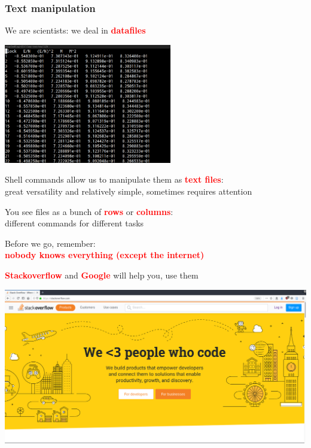 \documentclass[unknownkeysallowed, 10pt, a4 paper, handout]{beamer}
\newcommand{\focus}[1]{\textbf{\textcolor{red}{#1}}}
\begin{document}
\begin{frame}
  \begin{center}
    \frametitle{Text manipulation}
    We are scientists: we deal in \focus{datafiles}

    \begin{center}
      \includegraphics[width=0.55\textwidth]{pics/datafile.png}
    \end{center}

    Shell commands allow us to manipulate them as \focus{text files}:\\
    great versatility and relatively simple, sometimes requires attention

    You see files as a bunch of \focus{rows} or \focus{columns}:\\
    different commands for different tasks
  \end{center}
\end{frame}

\begin{frame}
  \begin{center}
    Before we go, remember:\\
    \focus{nobody knows everything (except the internet)}

    \focus{Stackoverflow} and \focus{Google} will help you, use them

    \begin{center}
      \includegraphics[width=1.00\textwidth]{pics/stackoverflow.png}
    \end{center}
  \end{center}
\end{frame}
\end{document}
